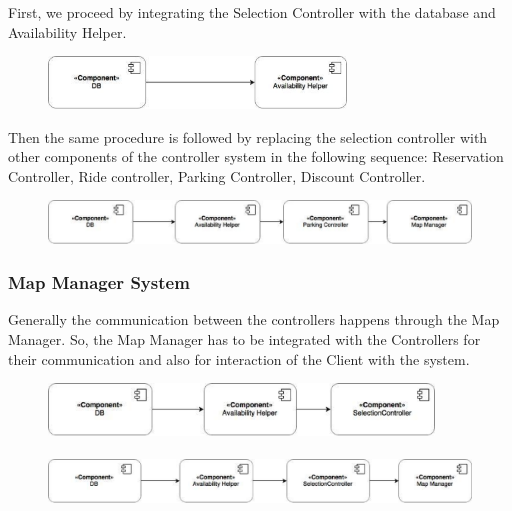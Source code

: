 First, we proceed by integrating the Selection Controller with the database and Availability Helper.

\begin{figure}[h]
	\centering
	\includegraphics[height=1.4cm,keepaspectratio]{figures/itp1.eps}
	\label{fig:itp1}
\end{figure}

Then the same procedure is followed by replacing the selection controller with other components of the controller system in the following sequence: Reservation Controller, Ride controller, Parking Controller, Discount Controller.

\begin{figure}[h]
	\centering
	\includegraphics[width=\linewidth,keepaspectratio]{figures/itp6.eps}
	\label{fig:itp6}
\end{figure}

\subsubsection*{Map Manager System}
Generally the communication between the controllers happens through the Map Manager. So, the Map Manager has to be integrated with the Controllers for their communication and also for interaction of the Client with the system.

\begin{figure}[h]
	\centering
	\includegraphics[height=1.4cm,keepaspectratio]{figures/itp2.eps}
	\label{fig:itp2}
\end{figure}

\begin{figure}[h]
	\centering
	\includegraphics[height=1.4cm,keepaspectratio]{figures/itp3.eps}
	\label{fig:itp3}
\end{figure}

